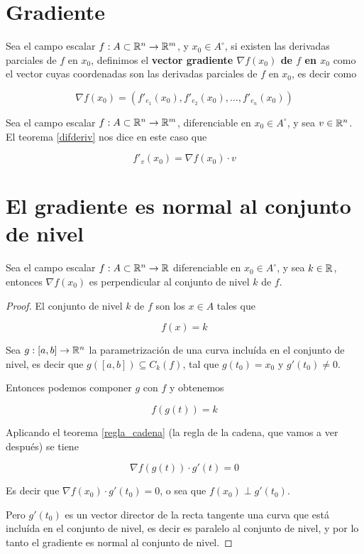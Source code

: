 \section{Gradiente}

\begin{definition}[Gradiente]
Sea el campo escalar $ f : A \subset \mathbb{R}^n \to \mathbb{R}^m$, y $x_0 \in A^{\circ}$, si existen las derivadas parciales de $f$ en $x_0$, definimos el \textbf{vector gradiente $\nabla f(x_0)$ de $f$ en $x_0$}  como el vector cuyas coordenadas son las derivadas parciales de $f$ en $x_0$, es decir como

$$ \nabla f(x_0) = (f'_{e_1}(x_0), f'_{e_2}(x_0), \ldots, f'_{e_n}(x_0) ) $$

\end{definition}

\begin{observation} \label{graderiv}

Sea el campo escalar $ f : A \subset \mathbb{R}^n \to \mathbb{R}^m$, diferenciable en $x_0 \in A^{\circ}$, y sea $v \in \mathbb{R}^n$. El teorema \ref{difderiv} nos dice en este caso que

$$ f'_v(x_0) = \nabla f(x_0) \cdot v $$

\end{observation}

\section{El gradiente es normal al conjunto de nivel}

\begin{observation}
Sea el campo escalar $ f : A \subset \mathbb{R}^n \to \mathbb{R}$ diferenciable en $x_0 \in A^{\circ}$, y sea $ k \in \mathbb{R}$, entonces $ \nabla f(x_0)$ es perpendicular al conjunto de nivel $k$ de $f$.
\end{observation}

\begin{proof}

El conjunto de nivel $k$ de $f$ son los $x \in A$ tales que

$$ f(x) = k $$

Sea $ g:[a,b] \to \mathbb{R}^n$ la parametrización de una curva incluída en el conjunto de nivel, es decir que $g([a,b]) \subseteq C_k(f)$, tal que $g(t_0) = x_0$ y $g'(t_0) \neq 0$.

Entonces podemos componer $g$ con $f$ y obtenemos

$$ f(g(t)) = k $$

Aplicando el teorema \ref{regla_cadena} (la regla de la cadena, que vamos a ver después) se tiene

$$ \nabla f(g(t)) \cdot g'(t) = 0 $$

Es decir que $ \nabla f(x_0) \cdot g'(t_0) = 0$, o sea que $ f(x_0) \perp g'(t_0)$.  

Pero $ g'(t_0)$ es un vector director de la recta tangente una curva que está incluída en el conjunto de nivel, es decir es paralelo al conjunto de nivel, y por lo tanto el gradiente es normal al conjunto de nivel.

\end{proof}

